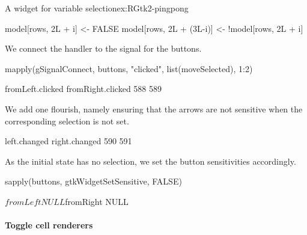 \begin{example}{A widget for variable selection}{ex:RGtk2-pingpong}
\begin{Schunk}
\begin{Sinput}
{{     model[rows, 2L + i] <- FALSE
     model[rows, 2L + (3L-i)] <- !model[rows, 2L + i]
   }
 }
\end{Sinput}
\end{Schunk}
We connect the handler to the  signal for the buttons.
\begin{Schunk}
\begin{Sinput}
 mapply(gSignalConnect, buttons, "clicked", list(moveSelected), 1:2)
\end{Sinput}
\begin{Soutput}
 fromLeft.clicked fromRight.clicked 
              588               589 
\end{Soutput}
\end{Schunk}

We add one flourish, namely ensuring that the arrows are not sensitive
when the corresponding selection is not set.
\begin{Schunk}
\begin{Soutput}
 left.changed right.changed 
          590           591 
\end{Soutput}
\end{Schunk}
%
As the initial state has no selection, we set the button
sensitivities accordingly.
\begin{Schunk}
\begin{Sinput}
 sapply(buttons, gtkWidgetSetSensitive, FALSE)
\end{Sinput}
\begin{Soutput}
$fromLeft
NULL

$fromRight
NULL
\end{Soutput}
\end{Schunk}
\end{example}

\paragraph{Toggle cell renderers}

